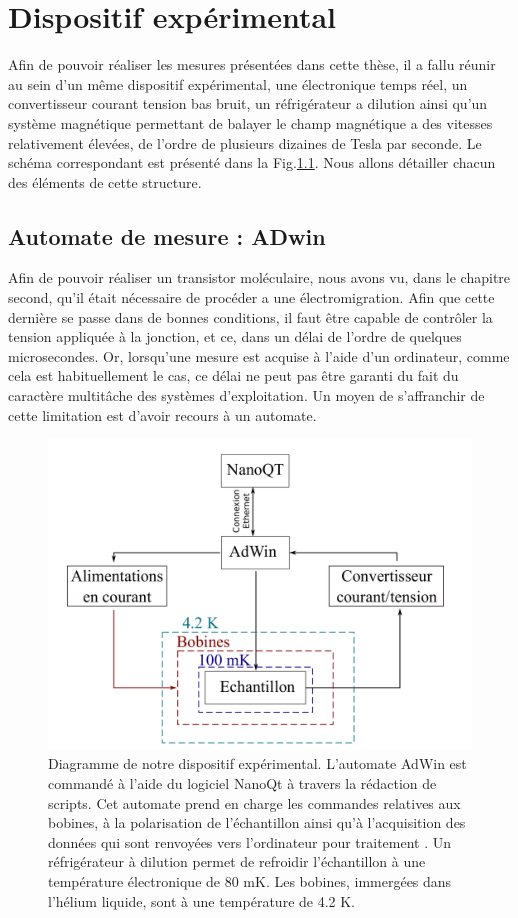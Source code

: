\chapter{Dispositif expérimental}


Afin de pouvoir réaliser les mesures présentées dans cette thèse, il a fallu réunir au sein d’un même dispositif expérimental, une électronique temps réel, un convertisseur courant tension bas bruit, un réfrigérateur a dilution ainsi qu’un système magnétique permettant de balayer le champ magnétique a des vitesses relativement élevées, de l’ordre de plusieurs dizaines de Tesla par seconde. Le schéma correspondant est présenté dans la Fig.\ref{ann3fig}. Nous allons détailler chacun des éléments de cette structure.

\section{Automate de mesure : ADwin}
Afin de pouvoir réaliser un transistor moléculaire, nous avons vu, dans le chapitre second, qu’il était nécessaire de procéder a une électromigration. Afin que cette dernière se passe dans de bonnes conditions, il faut être capable de contrôler la tension appliquée à la jonction, et ce, dans un délai de l’ordre
de quelques microsecondes. Or, lorsqu’une mesure est acquise à l’aide d’un ordinateur, comme cela est habituellement le cas, ce délai ne peut pas être garanti du fait du caractère multitâche des systèmes d’exploitation. Un moyen de s’affranchir de cette limitation est d’avoir recours à un automate.

\begin{figure}
\centering \includegraphics[scale=0.35]{Annexe4/annexe4fig.png}
\caption{Diagramme de notre dispositif expérimental. L’automate AdWin est commandé à l’aide du logiciel NanoQt à travers la rédaction de scripts. Cet automate prend en charge les commandes relatives aux bobines, à la polarisation de l’échantillon ainsi qu’à l’acquisition des données qui sont renvoyées vers l’ordinateur pour traitement . Un réfrigérateur à dilution permet de refroidir l’échantillon à une température électronique de 80 mK. Les bobines, immergées dans l’hélium liquide, sont à une température de 4.2 K.}
\label{ann3fig}
\end{figure}

